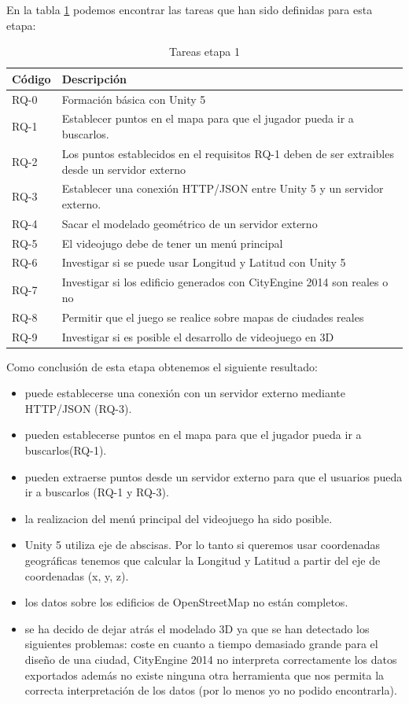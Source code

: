 En la tabla \ref{tabla:requisitosEtapa1} podemos encontrar las tareas que han sido definidas para esta etapa:

\begin{table}[H]
\begin{center}
\begin{tabular}{|p{1.5cm}| p{10.5cm}|}
\hline 
Código & Descripción \\
\hline \hline
RQ-0  & Formación básica con Unity 5\\ \hline
RQ-1  & Establecer puntos en el mapa para que el jugador pueda ir a buscarlos. \\ \hline
RQ-2  & Los puntos establecidos en el requisitos RQ-1 deben de ser extraibles desde un servidor externo\\ \hline
RQ-3  & Establecer una conexión HTTP/JSON entre Unity 5 y un servidor externo. \\ \hline
RQ-4  & Sacar el modelado geométrico de un servidor externo \\ \hline
RQ-5  & El videojugo debe de tener un menú principal \\ \hline
RQ-6  & Investigar si se puede usar Longitud y Latitud con Unity 5 \\ \hline
RQ-7  & Investigar si los edificio generados con CityEngine 2014 son reales o no \\ \hline
RQ-8  & Permitir que el juego se realice sobre mapas de ciudades reales \\ \hline
RQ-9  & Investigar si es posible el desarrollo de videojuego en 3D \\ \hline
\end{tabular}
\caption{Tareas etapa 1}
\label{tabla:requisitosEtapa1}
\end{center}
\end{table}

Como conclusión de esta etapa obtenemos el siguiente resultado:
\begin{itemize}
	\item puede establecerse una conexión con un servidor externo mediante HTTP/JSON (RQ-3). 
	\item pueden establecerse puntos en el mapa para que el jugador pueda ir a buscarlos(RQ-1). 
	\item pueden extraerse puntos desde un servidor externo para que el usuarios pueda ir a buscarlos (RQ-1 y RQ-3).
	\item la realizacion del menú principal del videojuego ha sido posible.
	\item Unity 5 utiliza eje de abscisas. Por lo tanto si queremos usar coordenadas geográficas tenemos que calcular la Longitud y Latitud a partir del eje de coordenadas (x, y, z).
	\item los datos sobre los edificios de OpenStreetMap no están completos.
	\item se ha decido de dejar atrás el modelado 3D ya que se han detectado los siguientes problemas: coste en cuanto a tiempo demasiado grande para el diseño de una ciudad, CityEngine 2014 no interpreta correctamente los datos exportados además no existe ninguna otra herramienta que nos permita la correcta interpretación de los datos (por lo menos yo no podido encontrarla).
\end{itemize}

